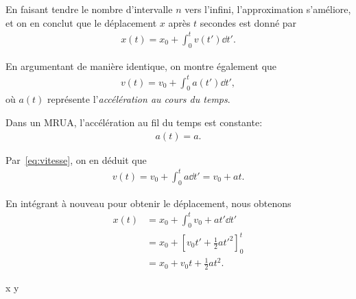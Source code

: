 \documentclass[main.tex]{subfiles}
\begin{document}
En faisant tendre le nombre d'intervalle $n$ vers l'infini,
l'approximation s'améliore,
et on en conclut que le déplacement $x$ après $t$ secondes est donné par
\begin{align}
    x(t) = x_0 + \int_0^t v(t') \dd t'.
\end{align}

En argumentant de manière identique,
on montre également que
\begin{align}
    v(t) = v_0 + \int_0^t a(t') \dd t',
    \label{eq:vitesse}
\end{align}
où $a(t)$ représente l'\emph{accélération au cours du temps}.

\begin{example}

    Dans un MRUA,
    l'accélération au fil du temps est constante:
    \begin{align}
        a(t) = a.
    \end{align}

    Par~\eqref{eq:vitesse},
    on en déduit que
    \begin{align}
        v(t) = v_0 + \int_0^t a \dd t' = v_0 + a t.
    \end{align}

    En intégrant à nouveau pour obtenir le déplacement,
    nous obtenons
    \begin{align}
        x(t) &= x_0 + \int_0^t v_0 + at' \dd t'\\
             &= x_0 + \left[v_0 t' + \frac 1 2 a t'^2 \right]^t_0\\
             &= x_0 + v_0 t + \frac 1 2 a t^2.
    \end{align}
\end{example}

 x y
\end{document}
